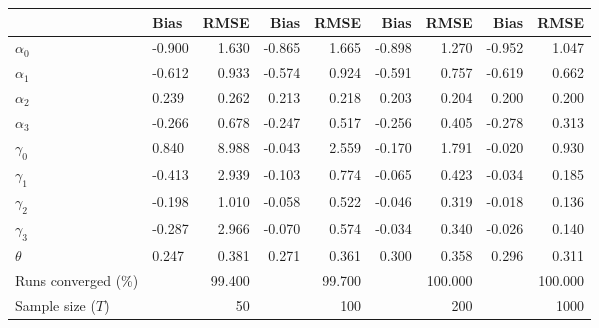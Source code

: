 
\begin{tabular}[t]{llrrrrrrr}
\toprule
  & Bias & RMSE & Bias & RMSE & Bias & RMSE & Bias & RMSE\\
\midrule
$\alpha_{0}$ & -0.900 & 1.630 & -0.865 & 1.665 & -0.898 & 1.270 & -0.952 & 1.047\\
$\alpha_{1}$ & -0.612 & 0.933 & -0.574 & 0.924 & -0.591 & 0.757 & -0.619 & 0.662\\
$\alpha_{2}$ & 0.239 & 0.262 & 0.213 & 0.218 & 0.203 & 0.204 & 0.200 & 0.200\\
$\alpha_{3}$ & -0.266 & 0.678 & -0.247 & 0.517 & -0.256 & 0.405 & -0.278 & 0.313\\
$\gamma_{0}$ & 0.840 & 8.988 & -0.043 & 2.559 & -0.170 & 1.791 & -0.020 & 0.930\\
$\gamma_{1}$ & -0.413 & 2.939 & -0.103 & 0.774 & -0.065 & 0.423 & -0.034 & 0.185\\
$\gamma_{2}$ & -0.198 & 1.010 & -0.058 & 0.522 & -0.046 & 0.319 & -0.018 & 0.136\\
$\gamma_{3}$ & -0.287 & 2.966 & -0.070 & 0.574 & -0.034 & 0.340 & -0.026 & 0.140\\
$\theta$ & 0.247 & 0.381 & 0.271 & 0.361 & 0.300 & 0.358 & 0.296 & 0.311\\
Runs converged (\%) &  & 99.400 &  & 99.700 &  & 100.000 &  & 100.000\\
Sample size ($T$) &  & 50 &  & 100 &  & 200 &  & 1000\\
\bottomrule
\end{tabular}
